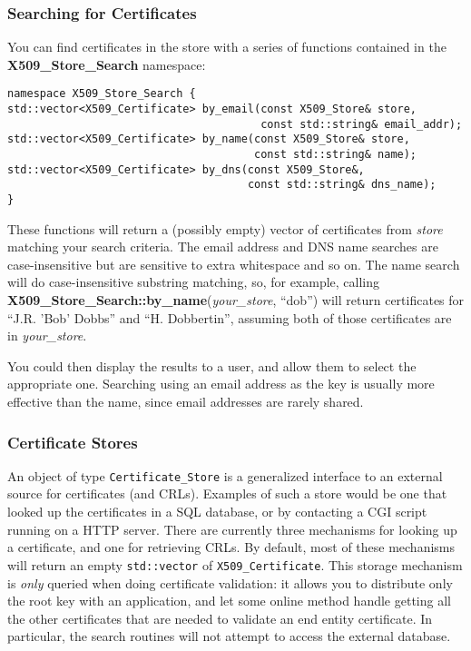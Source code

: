 \documentclass{article}
\newcommand{\function}[1]{\textbf{#1}}
\newcommand{\type}[1]{\texttt{#1}}
\renewcommand{\arg}[1]{\textsl{#1}}
\begin{document}
\subsubsection{Searching for Certificates}

You can find certificates in the store with a series of functions contained
in the \function{X509\_Store\_Search} namespace:

\begin{verbatim}
namespace X509_Store_Search {
std::vector<X509_Certificate> by_email(const X509_Store& store,
                                       const std::string& email_addr);
std::vector<X509_Certificate> by_name(const X509_Store& store,
                                      const std::string& name);
std::vector<X509_Certificate> by_dns(const X509_Store&,
                                     const std::string& dns_name);
}
\end{verbatim}

These functions will return a (possibly empty) vector of certificates from
\arg{store} matching your search criteria. The email address and DNS name
searches are case-insensitive but are sensitive to extra whitespace and so
on. The name search will do case-insensitive substring matching, so, for
example, calling \function{X509\_Store\_Search::by\_name}(\arg{your\_store},
``dob'') will return certificates for ``J.R. 'Bob' Dobbs'' and
``H. Dobbertin'', assuming both of those certificates are in \arg{your\_store}.

You could then display the results to a user, and allow them to select the
appropriate one. Searching using an email address as the key is usually more
effective than the name, since email addresses are rarely shared.

\subsubsection{Certificate Stores}

An object of type \type{Certificate\_Store} is a generalized interface
to an external source for certificates (and CRLs). Examples of such a
store would be one that looked up the certificates in a SQL database,
or by contacting a CGI script running on a HTTP server. There are
currently three mechanisms for looking up a certificate, and one for
retrieving CRLs. By default, most of these mechanisms will return an
empty \type{std::vector} of \type{X509\_Certificate}. This storage
mechanism is \emph{only} queried when doing certificate validation: it
allows you to distribute only the root key with an application, and
let some online method handle getting all the other certificates that
are needed to validate an end entity certificate. In particular, the
search routines will not attempt to access the external database.
\end{document}
